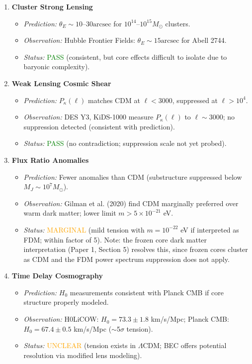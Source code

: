 \documentclass[11pt,a4paper]{article}
\newcommand{\Msun}{\ensuremath{M_\odot}}
\newcommand{\arcsec}{\ensuremath{\text{arcsec}}}
\theoremstyle{definition}
\theoremstyle{remark}
\begin{document}
\begin{enumerate}[leftmargin=*, label=\textbf{Criterion \arabic*:}, itemsep=0.5em]
\item \textbf{Cluster Strong Lensing}
\begin{itemize}[leftmargin=*, itemsep=0.2em]
\item \emph{Prediction:} $\theta_E \sim 10$--$30\arcsec$ for $10^{14}$--$10^{15} \Msun$ clusters.
\item \emph{Observation:} Hubble Frontier Fields: $\theta_E \sim 15\arcsec$ for Abell 2744.
\item \emph{Status:} \textcolor{green}{PASS} (consistent, but core effects difficult to isolate due to baryonic complexity).
\end{itemize}

\item \textbf{Weak Lensing Cosmic Shear}
\begin{itemize}[leftmargin=*, itemsep=0.2em]
\item \emph{Prediction:} $P_\kappa(\ell)$ matches CDM at $\ell < 3000$, suppressed at $\ell > 10^4$.
\item \emph{Observation:} DES Y3, KiDS-1000 measure $P_\kappa(\ell)$ to $\ell \sim 3000$; no suppression detected (consistent with prediction).
\item \emph{Status:} \textcolor{green}{PASS} (no contradiction; suppression scale not yet probed).
\end{itemize}

\item \textbf{Flux Ratio Anomalies}
\begin{itemize}[leftmargin=*, itemsep=0.2em]
\item \emph{Prediction:} Fewer anomalies than CDM (substructure suppressed below $M_J \sim 10^7 \Msun$).
\item \emph{Observation:} Gilman et al. (2020) find CDM marginally preferred over warm dark matter; lower limit $m > 5 \times 10^{-21}$ eV.
\item \emph{Status:} \textcolor{orange}{MARGINAL} (mild tension with $m = 10^{-22}$ eV if interpreted as FDM; within factor of 5). Note: the frozen core dark matter interpretation (Paper 1, Section 5) resolves this, since frozen cores cluster as CDM and the FDM power spectrum suppression does not apply.
\end{itemize}

\item \textbf{Time Delay Cosmography}
\begin{itemize}[leftmargin=*, itemsep=0.2em]
\item \emph{Prediction:} $H_0$ measurements consistent with Planck CMB if core structure properly modeled.
\item \emph{Observation:} H0LiCOW: $H_0 = 73.3 \pm 1.8$ km/s/Mpc; Planck CMB: $H_0 = 67.4 \pm 0.5$ km/s/Mpc ($\sim$5$\sigma$ tension).
\item \emph{Status:} \textcolor{orange}{UNCLEAR} (tension exists in $\Lambda$CDM; BEC offers potential resolution via modified lens modeling).
\end{itemize}

\end{enumerate}
\end{document}

